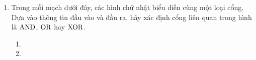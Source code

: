\begin{multicols}{2}
\begin{enumerate}
\begin{enumerate}
    \item {}

    \item {}

    \end{enumerate}

  \item Trong mỗi mạch dưới đây, các hình chữ nhật biểu diễn cùng một loại cổng. Dựa vào
    thông tin đầu vào và đầu ra, hãy xác định cổng liên quan trong hình là $\operatorname{\mbox{AND}}$, $\operatorname{\mbox{OR}}$
    hay $\operatorname{\mbox{XOR}}$.
    \begin{enumerate}
    \item {}

    \item {}


\end{enumerate}
\end{enumerate}
\end{multicols}
